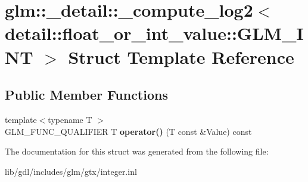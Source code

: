 \hypertarget{structglm_1_1__detail_1_1__compute__log2_3_01detail_1_1float__or__int__value_1_1_g_l_m___i_n_t_01_4}{}\section{glm\+:\+:\+\_\+detail\+:\+:\+\_\+compute\+\_\+log2$<$ detail\+:\+:float\+\_\+or\+\_\+int\+\_\+value\+:\+:G\+L\+M\+\_\+\+I\+N\+T $>$ Struct Template Reference}
\label{structglm_1_1__detail_1_1__compute__log2_3_01detail_1_1float__or__int__value_1_1_g_l_m___i_n_t_01_4}
\subsection*{Public Member Functions}
\begin{DoxyCompactItemize}
\item 
\hypertarget{structglm_1_1__detail_1_1__compute__log2_3_01detail_1_1float__or__int__value_1_1_g_l_m___i_n_t_01_4_aa739d9d5f580facbbf7f4925bc62d97e}{}{\footnotesize template$<$typename T $>$ }\\G\+L\+M\+\_\+\+F\+U\+N\+C\+\_\+\+Q\+U\+A\+L\+I\+F\+I\+E\+R T {\bfseries operator()} (T const \&Value) const \label{structglm_1_1__detail_1_1__compute__log2_3_01detail_1_1float__or__int__value_1_1_g_l_m___i_n_t_01_4_aa739d9d5f580facbbf7f4925bc62d97e}

\end{DoxyCompactItemize}


The documentation for this struct was generated from the following file\+:\begin{DoxyCompactItemize}
\item 
lib/gdl/includes/glm/gtx/integer.\+inl\end{DoxyCompactItemize}
